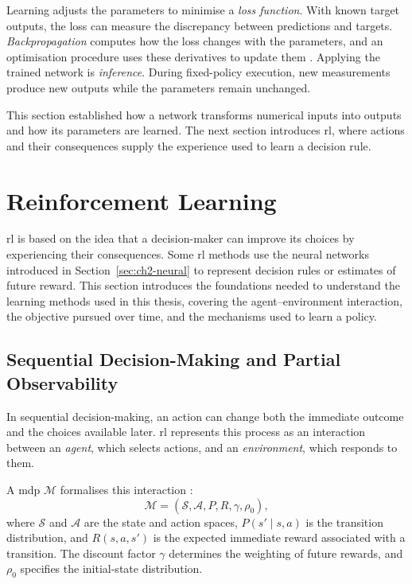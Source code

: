 Learning adjusts the parameters to minimise a \emph{loss function}. With known target outputs, the loss can measure the discrepancy between predictions and targets. \emph{Backpropagation} computes how the loss changes with the parameters, and an optimisation procedure uses these derivatives to update them \parencite{goodfellow2016deep}. Applying the trained network is \emph{inference}. During fixed-policy execution, new measurements produce new outputs while the parameters remain unchanged.

This section established how a network transforms numerical inputs into outputs and how its parameters are learned. The next section introduces \gls{rl}, where actions and their consequences supply the experience used to learn a decision rule.

\FloatBarrier
{}
\section{Reinforcement Learning}
\label{sec:ch2-rl}

\gls{rl} is based on the idea that a decision-maker can improve its choices by experiencing their consequences. Some \gls{rl} methods use the neural networks introduced in Section~\ref{sec:ch2-neural} to represent decision rules or estimates of future reward. This section introduces the foundations needed to understand the learning methods used in this thesis, covering the agent--environment interaction, the objective pursued over time, and the mechanisms used to learn a policy.

\subsection{Sequential Decision-Making and Partial Observability}
\label{sec:ch2-mdp}
\label{sec:ch2-pomdp}

In sequential decision-making, an action can change both the immediate outcome and the choices available later. \gls{rl} represents this process as an interaction between an \emph{agent}, which selects actions, and an \emph{environment}, which responds to them.

A \gls{mdp} $\mathcal M$ formalises this interaction \parencite{sutton2018rl}:
\begin{equation}
\mathcal M=(\mathcal S,\mathcal A,P,R,\gamma,\rho_0),
\label{eq:ch2-mdp}
\end{equation}
where $\mathcal S$ and $\mathcal A$ are the state and action spaces, $P(s'\mid s,a)$ is the transition distribution, and $R(s,a,s')$ is the expected immediate reward associated with a transition. The discount factor $\gamma$ determines the weighting of future rewards, and $\rho_0$ specifies the initial-state distribution.

